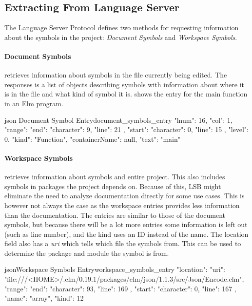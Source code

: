 \documentclass[../thesis.tex]{subfiles}
\begin{document}
\subsection{Extracting From Language Server}%
The Language Server Protocol defines two methods for requesting information about the symbols in the project: \textit{Document Symbols} and \textit{Workspace Symbols}.

\paragraph{Document Symbols} retrieves information about symbols in the file currently being edited.
The responses is a list of objects describing symbols with information about where it is in the file
and what kind of symbol it is.  shows the entry for the main function in an Elm program.
\begin{code}{ json }{Document Symbol Entry}{document_symbols_entry}
{
  "lnum": 16,
  "col": 1,
  "range": {
    "end": { "character": 9, "line": 21 },
    "start": { "character": 0, "line": 15 }
  },
  "level": 0,
  "kind": "Function",
  "containerName": null,
  "text": "main"
} 
\end{code}

\paragraph{Workspace Symbols} retrieves information about symbols and entire project.
This also includes symbols in packages the project depends on.
Because of this, LSB might eliminate the need to analyze documentation directly for some use cases.
This is however not always the case as the workspace entries provides less information than the documentation.
The entries are similar to those of the document symbols, but because there will be a lot more entries some
information is left out (such as line number), and the kind uses an ID instead of the name.
The location field also has a \textit{uri} which tells which file the symbols from.
This can be used to determine the package and module the symbol is from.
\begin{code}{json}{Workspace Symbols Entry}{workspace_symbols_entry}
{ 
  "location": {
  "uri":
    "file:///<HOME>/.elm/0.19.1/packages/elm/json/1.1.3/src/Json/Encode.elm",
  "range": {
    "end": { "character": 93, "line": 169 },
    "start": { "character": 0, "line": 167 }
    }
  },
  "name": "array",
  "kind": 12 
}
\end{code} 
\end{document}
